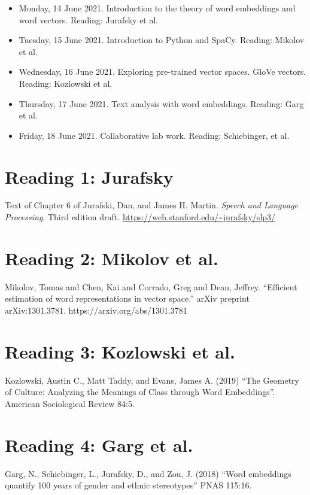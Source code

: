 \documentclass[a4paper]{report}
\begin{document}
\begin{itemize}
  \item Monday, 14 June 2021. Introduction to the theory of word embeddings and word vectors. Reading: Jurafsky et al.
  \item Tuesday, 15 June 2021. Introduction to Python and SpaCy. Reading: Mikolov et al.
  \item Wednesday, 16 June 2021. Exploring pre-trained vector spaces. GloVe vectors. Reading: Kozlowski et al.
  \item Thursday, 17 June 2021. Text analysis with word embeddings. Reading: Garg et al.
  \item Friday, 18 June 2021. Collaborative lab work. Reading: Schiebinger, et al.
\end{itemize}

\chapter{Reading 1: Jurafsky}

Text of Chapter 6 of Jurafski, Dan, and James H. Martin. \emph{Speech and Language Processing}. Third edition draft. \url{https://web.stanford.edu/~jurafsky/slp3/}

  

\chapter{Reading 2: Mikolov et al.}

Mikolov, Tomas and Chen, Kai and Corrado, Greg and Dean, Jeffrey. ``Efficient estimation of word representations in vector space.'' arXiv preprint arXiv:1301.3781. https://arxiv.org/abs/1301.3781

  

\chapter{Reading 3: Kozlowski et al.}

Kozlowski, Austin C., Matt Taddy, and Evans, James A. (2019) ``The Geometry of Culture: Analyzing the Meanings of Class through Word Embeddings''. American Sociological Review 84:5.

  

\chapter{Reading 4: Garg et al.}

Garg, N., Schiebinger, L., Jurafsky, D., and Zou, J. (2018) ``Word embeddings quantify 100 years of gender and ethnic stereotypes'' PNAS 115:16.

  
\end{document}
